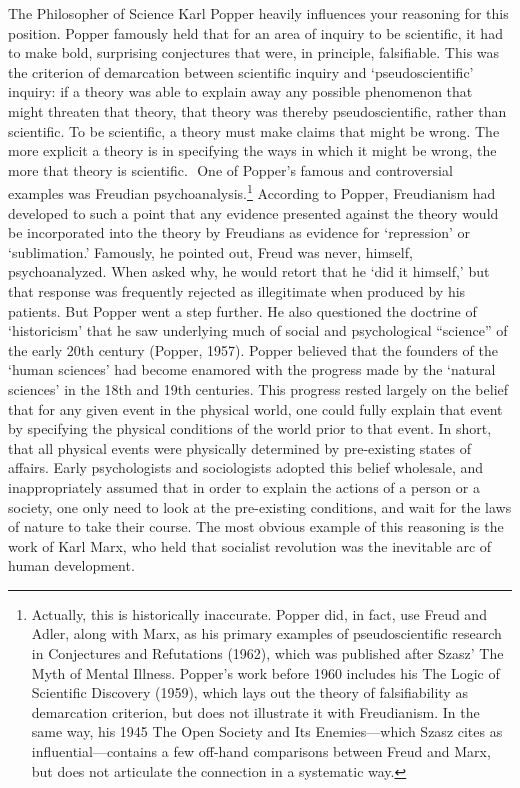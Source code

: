 The Philosopher of Science Karl Popper heavily influences your reasoning for this position. Popper famously held that for an area of inquiry to be scientific, it had to make bold, surprising conjectures that were, in principle, falsifiable. This was the criterion of demarcation between scientific inquiry and `pseudoscientific' inquiry: if a theory was able to explain away any possible phenomenon that might threaten that theory, that theory was thereby pseudoscientific, rather than scientific. To be scientific, a theory must make claims that might be wrong. The more explicit a theory is in specifying the ways in which it might be wrong, the more that theory is scientific.  One of Popper’s famous and controversial examples was Freudian psychoanalysis.\footnote{Actually, this is historically inaccurate. Popper did, in fact, use Freud and Adler, along with Marx, as his primary examples of pseudoscientific research in Conjectures and Refutations (1962), which was published after Szasz' The Myth of Mental Illness. Popper's work before 1960 includes his The Logic of Scientific Discovery (1959), which lays out the theory of falsifiability as demarcation criterion, but does not illustrate it with Freudianism. In the same way, his 1945 The Open Society and Its Enemies—which Szasz cites as influential—contains a few off-hand comparisons between Freud and Marx, but does not articulate the connection in a systematic way.} According to Popper, Freudianism had developed to such a point that any evidence presented against the theory would be incorporated into the theory by Freudians as evidence for ‘repression’ or ‘sublimation.’ Famously, he pointed out, Freud was never, himself, psychoanalyzed. When asked why, he would retort that he `did it himself,' but that response was frequently rejected as illegitimate when produced by his patients.
But Popper went a step further. He also questioned the doctrine of ‘historicism’ that he saw underlying much of social and psychological “science” of the early 20th century (Popper, 1957). Popper believed that the founders of the ‘human sciences’ had become enamored with the progress made by the ‘natural sciences’ in the 18th and 19th centuries. This progress rested largely on the belief that for any given event in the physical world, one could fully explain that event by specifying the physical conditions of the world prior to that event. In short, that all physical events were physically determined by pre-existing states of affairs. Early psychologists and sociologists adopted this belief wholesale, and inappropriately assumed that in order to explain the actions of a person or a society, one only need to look at the pre-existing conditions, and wait for the laws of nature to take their course. The most obvious example of this reasoning is the work of Karl Marx, who held that socialist revolution was the inevitable arc of human development.\\
